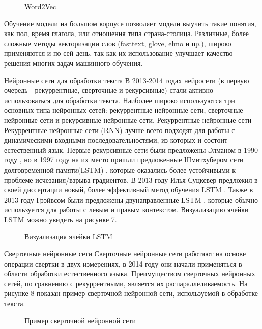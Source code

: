 \begin{figure}[ht]
  \caption{Word2Vec}\label{fig:Neuro2-Word2Vec}
\end{figure}

Обучение модели на большом корпусе позволяет модели выучить такие понятия, как пол, время глагола, или отношения типа страна-столица. Различные, более сложные методы векторизации слов (fasttext, glove, elmo и пр.), широко применяются и по сей день, так как их использование улучшает качество решения многих задач машинного обучения.


Нейронные сети для обработки текста
В 2013-2014 годах нейросети (в первую очередь - рекуррентные, сверточные и рекурсивные) стали активно использоваться для обработки текста.  Наиболее широко используются три основных типа нейронных сетей: рекуррентные нейронные сети, сверточные нейронные сети и рекурсивные нейронные сети. 
Рекуррентные нейронные сети
Рекуррентные нейронные сети (RNN) лучше всего подходят для работы с динамическими входными последовательностями, из которых и состоит естественный язык.  Первые рекурсивные сети были предложены Элманом в 1990 году \cite{Elman_1990}, но в 1997 году на их место пришли предложенные Шмитхубером сети долговременной памяти(LSTM) \cite{Hochreiter_Schmidhuber_1997}, которые оказались более устойчивыми к проблеме исчезания/взрыва градиентов. В 2013 году Илья Суцкевер предложил в своей диссертации новый, более эффективный метод обучения LSTM \cite{Suskever_2013}. Также в 2013 году Грэйвсом были предложены двунаправленные LSTM \cite{Graves_Jaitly_Mohamed_2013}, которые обычно используется для работы с левым и правым контекстом. Визуализацию ячейки LSTM можно увидеть на рисунке 7.  


\begin{figure}[ht]
  \caption{Визуализация ячейки LSTM}\label{fig:Neuro3-LSTM}
\end{figure}


Сверточные нейронные сети
Сверточные нейронные сети работают на основе операции свертки в двух измерениях, в 2014 году \cite{Kalchbrenner_Grefenstette_Blunsom_2014} они начали применяться в области обработки естественного языка. Преимуществом сверточных нейронных сетей, по сравнению с рекуррентными, является их распараллеливаемость. На рисунке 8 показан пример сверточной нейронной сети, используемой в обработке текста.


\begin{figure}[ht]
  \caption{Пример сверточной нейронной сети}\label{fig:Neuro4-CNN}
\end{figure}

